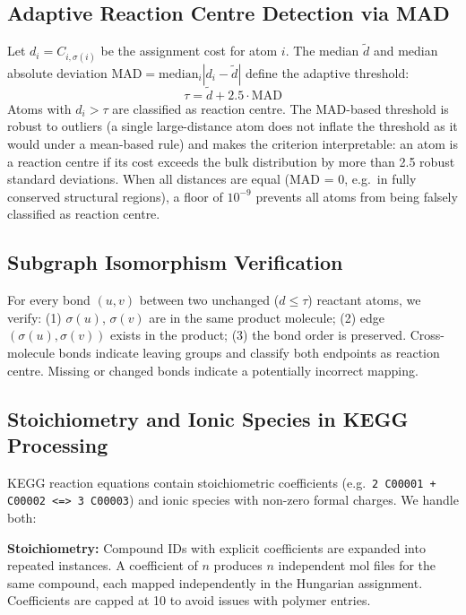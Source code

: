 \documentclass[12pt,a4paper]{article}
\begin{document}
\subsection{Adaptive Reaction Centre Detection via MAD}

Let $d_i = C_{i,\sigma(i)}$ be the assignment cost for atom $i$.
The median $\tilde{d}$ and median absolute deviation
$\mathrm{MAD} = \mathrm{median}_i |d_i - \tilde{d}|$ define the
adaptive threshold:
\begin{equation}
  \tau = \tilde{d} + 2.5 \cdot \mathrm{MAD}
  \label{eq:threshold}
\end{equation}
Atoms with $d_i > \tau$ are classified as reaction centre.
The MAD-based threshold is robust to outliers (a single large-distance
atom does not inflate the threshold as it would under a mean-based rule)
and makes the criterion interpretable: an atom is a reaction centre
if its cost exceeds the bulk distribution by more than 2.5 robust
standard deviations. When all distances are equal (MAD = 0, e.g.\ in
fully conserved structural regions), a floor of $10^{-9}$ prevents
all atoms from being falsely classified as reaction centre.

\subsection{Subgraph Isomorphism Verification}

For every bond $(u,v)$ between two unchanged ($d \leq \tau$) reactant
atoms, we verify: (1) $\sigma(u)$, $\sigma(v)$ are in the same product
molecule; (2) edge $(\sigma(u), \sigma(v))$ exists in the product;
(3) the bond order is preserved. Cross-molecule bonds indicate leaving
groups and classify both endpoints as reaction centre. Missing or
changed bonds indicate a potentially incorrect mapping.

\subsection{Stoichiometry and Ionic Species in KEGG Processing}

KEGG reaction equations contain stoichiometric coefficients
(e.g.\ \texttt{2 C00001 + C00002 <=> 3 C00003}) and ionic species
with non-zero formal charges. We handle both:

\textbf{Stoichiometry:} Compound IDs with explicit coefficients are
expanded into repeated instances. A coefficient of $n$ produces $n$
independent mol files for the same compound, each mapped independently
in the Hungarian assignment. Coefficients are capped at 10 to avoid
issues with polymer entries.
\end{document}
